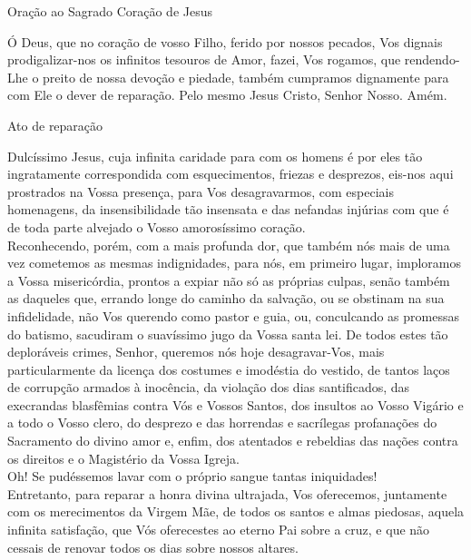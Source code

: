 \documentclass{book}
\begin{document}
\begin{center}
    Oração ao Sagrado Coração de Jesus
\end{center}
\begin{flushleft}
    Ó Deus, que no coração de vosso Filho, ferido por nossos pecados, Vos dignais prodigalizar-nos os infinitos tesouros de Amor, fazei, Vos rogamos, que rendendo-Lhe o preito de nossa devoção e piedade, também cumpramos dignamente para com Ele o dever de reparação. Pelo mesmo Jesus Cristo, Senhor Nosso. Amém.
\end{flushleft}
\begin{center}
    Ato de reparação
\end{center}
\begin{flushleft}
    Dulcíssimo Jesus, cuja infinita caridade para com os homens é por eles tão ingratamente correspondida com esquecimentos, friezas e desprezos, eis-nos aqui prostrados na Vossa presença, para Vos desagravarmos, com especiais homenagens, da insensibilidade tão insensata e das nefandas injúrias com que é de toda parte alvejado o Vosso amorosíssimo coração.
    \vspace{.2cm} \\
    Reconhecendo, porém, com a mais profunda dor, que também nós mais de uma vez cometemos as mesmas indignidades, para nós, em primeiro lugar, imploramos a Vossa misericórdia, prontos a expiar não só as próprias culpas, senão também as daqueles que, errando longe do caminho da salvação, ou se obstinam na sua infidelidade, não Vos querendo como pastor e guia, ou, conculcando as promessas do batismo, sacudiram o suavíssimo jugo da Vossa santa lei.
    \newpage
    De todos estes tão deploráveis crimes, Senhor, queremos nós hoje desagravar-Vos, mais particularmente da licença dos costumes e imodéstia do vestido, de tantos laços de corrupção armados à inocência, da violação dos dias santificados, das execrandas blasfêmias contra Vós e Vossos Santos, dos insultos ao Vosso Vigário e a todo o Vosso clero, do desprezo e das horrendas e sacrílegas profanações do Sacramento do divino amor e, enfim, dos atentados e rebeldias das nações contra os direitos e o Magistério da Vossa Igreja.
    \vspace{.2cm} \\
    Oh! Se pudéssemos lavar com o próprio sangue tantas iniquidades!
    \vspace{.2cm} \\
    Entretanto, para reparar a honra divina ultrajada, Vos oferecemos, juntamente com os merecimentos da Virgem Mãe, de todos os santos e almas piedosas, aquela infinita satisfação, que Vós oferecestes ao eterno Pai sobre a cruz, e que não cessais de renovar todos os dias sobre nossos altares.

\end{flushleft}
\end{document}
